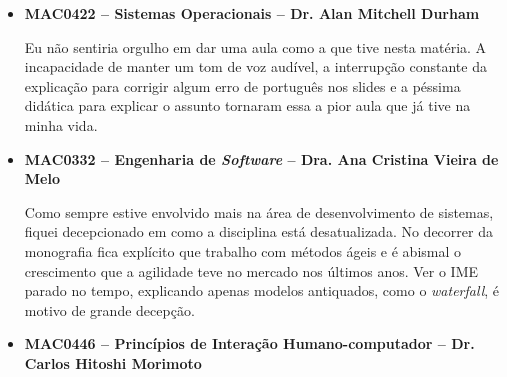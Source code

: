 \documentclass[titlepage,a4paper]{article}
\begin{document}
\begin{itemize}
	\item{\textbf{MAC0422 -- Sistemas Operacionais -- Dr. Alan Mitchell Durham}

	Eu não sentiria orgulho em dar uma aula como a que tive nesta matéria. A incapacidade de manter um tom de voz audível, a interrupção constante da explicação para corrigir algum erro de português nos slides e a péssima didática para explicar o assunto tornaram essa a pior aula que já tive na minha vida.}

	\item{\textbf{MAC0332 -- Engenharia de \textit{Software} -- Dra. Ana Cristina Vieira de Melo}

	Como sempre estive envolvido mais na área de desenvolvimento de sistemas, fiquei decepcionado em como a disciplina está desatualizada. No decorrer da monografia fica explícito que trabalho com métodos ágeis e é abismal o crescimento que a agilidade teve no mercado nos últimos anos. Ver o IME parado no tempo, explicando apenas modelos antiquados, como o \textit{waterfall}, é motivo de grande decepção.}

	\item{\textbf{MAC0446 -- Princípios de Interação Humano-computador -- Dr. Carlos Hitoshi Morimoto}

}
\end{itemize}
\end{document}
